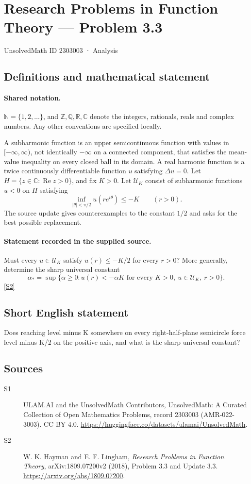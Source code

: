 \documentclass[11pt]{article}
\newcommand{\sref}[2]{\hyperlink{source:#1:#2}{[S#2]}}
\begin{document}
\setcounter{section}{2303002}
\section{Research Problems in Function Theory — Problem 3.3}\label{2303003}
{\small\sffamily UnsolvedMath ID 2303003 · Analysis}
\subsection{Definitions and mathematical statement}

\paragraph{Shared notation.}$\mathbb N=\{1,2,\ldots\}$, and $\mathbb Z,\mathbb Q,\mathbb R,\mathbb C$ denote the integers, rationals, reals and complex numbers. Any other conventions are specified locally.


A subharmonic function is an upper semicontinuous function with values in $[-\infty,\infty)$, not identically $-\infty$ on a connected component, that satisfies the mean-value inequality on every closed ball in its domain. A real harmonic function is a twice continuously differentiable function $u$ satisfying $\Delta u=0$. Let $H=\{z\in\mathbb C:\operatorname{Re}z>0\}$, and fix $K>0$. Let $\mathcal U_K$ consist of subharmonic functions $u<0$ on $H$ satisfying
\[\inf_{|\theta|<\pi/2}u(re^{i\theta})\leq-K\qquad(r>0).\]
The source update gives counterexamples to the constant $1/2$ and asks for the best possible replacement.
\paragraph{Statement recorded in the supplied source.}
Must every $u\in\mathcal U_K$ satisfy $u(r)\leq-K/2$ for every $r>0$? More generally, determine the sharp universal constant
\[\alpha_* =\sup\{\alpha\geq0: u(r)<-\alpha K\text{ for every }K>0,\ u\in\mathcal U_K,\ r>0\}.\] \sref{2303003}{2}
\subsection{Short English statement}
Does reaching level minus K somewhere on every right-half-plane semicircle force level minus K/2 on the positive axis, and what is the sharp universal constant?
\subsection{Sources}
\begin{description}
\item[\hypertarget{source:2303003:1}{S1}] ULAM.AI and the UnsolvedMath Contributors, UnsolvedMath: A Curated Collection of Open Mathematics Problems, record 2303003 (AMR-022-3003). CC BY 4.0. \url{https://huggingface.co/datasets/ulamai/UnsolvedMath}.
\item[\hypertarget{source:2303003:2}{S2}] W. K. Hayman and E. F. Lingham, \emph{Research Problems in Function Theory}, arXiv:1809.07200v2 (2018), Problem 3.3 and Update 3.3. \url{https://arxiv.org/abs/1809.07200}.
\end{description}
\label{end:2303003}
\end{document}
